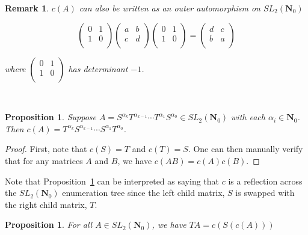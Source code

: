 \documentclass{article}
\newtheorem{proposition}[theorem]{Proposition}  %
\newtheorem{remark}[theorem]{Remark}  %
\begin{document}
\begin{remark}
$c(A)$ can also be written as an outer automorphism on $SL_2(\mathbf{N}_0)$

$$\begin{pmatrix}
    0 & 1 \\
    1 & 0 \\
\end{pmatrix}\begin{pmatrix}
    a & b \\
    c & d \\
\end{pmatrix}
\begin{pmatrix}
    0 & 1 \\
    1 & 0 \\
\end{pmatrix} = 
\begin{pmatrix} 
d & c \\ 
b & a \\
\end{pmatrix}
$$

where $\begin{pmatrix}
    0 & 1 \\
    1 & 0 \\
\end{pmatrix}$ has determinant $-1$.

\end{remark}

\



\begin{proposition}\label{refl}
Suppose $A = S^{\alpha_k} T^{\alpha_{k-1}} \cdots T^{\alpha_1}S^{\alpha_0} \in SL_2(\mathbf{N}_0)$ with each $\alpha_i \in \mathbf{N}_0$. Then $c(A) = T^{\alpha_k} S^{\alpha_{k-1}} \cdots S^{\alpha_1}T^{\alpha_0}$.
\end{proposition}

\begin{proof}
First, note that $c(S) = T$ and $c(T) = S$. One can then manually verify that for any matrices $A$ and $B$, we have $c(AB) = c(A)c(B)$.
\end{proof}

Note that Proposition~\ref{refl} can be interpreted as saying that $c$ is a  reflection across the $SL_2(\mathbf{N}_0)$ enumeration tree since the left child matrix, $S$ is swapped with the right child matrix, $T$.

\begin{proposition}\label{depmatrix}
For all $A \in SL_2(\mathbf{N}_0)$, we have $TA = c(S(c(A)))$ 
\end{proposition}
\end{document}
